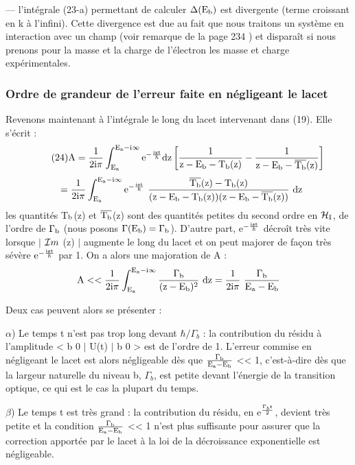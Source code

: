 — l'intégrale (23-a) permettant de calculer $\Delta(\text{E}_{\text{b}})$ est divergente (terme croissant en k à l'infini). Cette divergence est due au fait
que nous traitons un système en interaction avec un champ (voir remarque de
la page 234 ) et disparaît si nous prenons pour la masse et la charge de
l'électron les masse et charge expérimentales.

\subsubsection{Ordre de grandeur de l'erreur faite en négligeant le lacet} %
Revenons maintenant à l'intégrale le long du lacet intervenant dans (19). Elle s'écrit :
\[
\tag{24}\text{A}=\frac{1}{2\text{i}\pi}
\int_{\text{E}_{\text{a}}}^{\text{E}_{\text{a}}-\text{i}\infty}
\text{e}^{-\frac{\text{izt}}{\hbar}}\text{dz}
\left [
\frac{1}{\text{z}-\text{E}_{\text{b}}-\text{T}_{\text{b}}(\text{z})}-
\frac{1}{\text{z}-\text{E}_{\text{b}}-\overline{\text{T}_{\text{b}}}(\text{z})}
\right ]
\]
\[
\ \ =\frac{1}{2\mt{i}\pi}\int_{\mt{E}_\mt{a}}^{\mt{E}_\mt{a}-\mt{i}\infty}
\mt{e}^{-\frac{\mt{izt}}{\hbar}}\ \frac{\overline{\mt{T}_\mt{b}}(\mt{z})-\mt{T}_\mt{b}(\mt{z})}
{(\mt{z}-\mt{E}_\mt{b}-\mt{T}_\mt{b}(\mt{z}))(\mt{z}-\mt{E}_\mt{b}-\overline{\mt{T}_\mt{b}}(\mt{z}))}\ \mt{dz}
\]
les quantités T$_{\text{b}}$(z) et $\overline{\text{T}_{\text{b}}}$(z) sont des quantités petites du second ordre en
$\mathcal{H}_{\text{I}}$, de l'ordre de $\Gamma_{\text{b}}$ (nous posons  $\Gamma(\text{E}_{\text{b}})=\Gamma_{\text{b}}$). D'autre part,
e$^{-\frac{\text{izt}}{\hbar}}$
décroît très vite lorsque $|$ $\mathcal{I}m$ (z) $|$ augmente le long du lacet et on peut
majorer de façon très sévère $\text{e}^{-\frac{\text{izt}}{\hbar}}$ par 1. On a alors une majoration de A :
\[
\mt{A}<<\frac{1}{2\mt{i}\pi}\int_{\mt{E}_\mt{a}}^{\mt{E}_\mt{a}-\mt{i}\infty}
\frac{\Gamma_\mt{b}}{(\mt{z}-\mt{E}_\mt{b})^2}\ \mt{dz}=
\frac{1}{2\mt{i}\pi}\ \frac{\Gamma_\mt{b}}{\mt{E}_\mt{a}-\mt{E}_\mt{b}}
\]

Deux cas peuvent alors se présenter :

$\alpha$) Le temps t n'est pas trop long devant $\hbar/\Gamma_{b}$ : la contribution du résidu à
l'amplitude < b 0 $|$ U(t) $|$ b 0 > est de l'ordre de 1. L'erreur commise en négligeant
le lacet est alors négligeable dès que $\frac{\Gamma_{\text{b}}}{\text{E}_{\text{a}}-\text{E}_{\text{b}}}$ << 1, c'est-à-dire dès
que la largeur naturelle du niveau b, $\Gamma_{b}$, est petite devant l'énergie de la
transition optique, ce qui est le cas la plupart du temps.

$\beta$) Le temps t est très grand : la contribution du résidu, en e$^\frac{\Gamma_{b}\text{t}}{2}$, devient
très petite et la condition $\frac{\Gamma_{\text{b}}}{\text{E}_{\text{a}}-\text{E}_{\text{b}}}$ << 1 n'est plus suffisante pour assurer que la correction apportée par le lacet à la loi de la décroissance exponentielle est négligeable.

